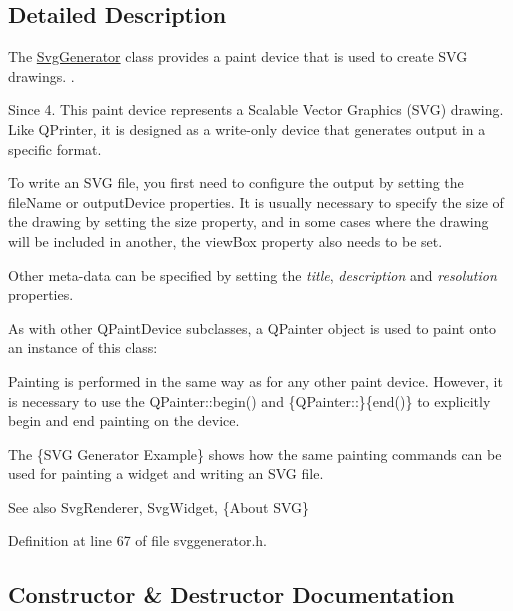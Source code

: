 \subsection{Detailed Description}
The \hyperlink{class_svg_generator}{Svg\+Generator} class provides a paint device that is used to create S\+VG drawings. . 

\begin{DoxySince}{Since}
4. This paint device represents a Scalable Vector Graphics (S\+VG) drawing. Like Q\+Printer, it is designed as a write-\/only device that generates output in a specific format.
\end{DoxySince}
To write an S\+VG file, you first need to configure the output by setting the  file\+Name or  output\+Device properties. It is usually necessary to specify the size of the drawing by setting the  size property, and in some cases where the drawing will be included in another, the  view\+Box property also needs to be set.


\begin{DoxyCodeInclude}
\end{DoxyCodeInclude}
 Other meta-\/data can be specified by setting the {\itshape title}, {\itshape description} and {\itshape resolution} properties.

As with other Q\+Paint\+Device subclasses, a Q\+Painter object is used to paint onto an instance of this class\+:


\begin{DoxyCodeInclude}
\end{DoxyCodeInclude}
 
\begin{DoxyCodeInclude}
\end{DoxyCodeInclude}
 Painting is performed in the same way as for any other paint device. However, it is necessary to use the Q\+Painter\+::begin() and \{Q\+Painter\+:\+:\}\{end()\} to explicitly begin and end painting on the device.

The \{S\+VG Generator Example\} shows how the same painting commands can be used for painting a widget and writing an S\+VG file.

\begin{DoxySeeAlso}{See also}
Svg\+Renderer, Svg\+Widget, \{About S\+VG\} 
\end{DoxySeeAlso}


Definition at line 67 of file svggenerator.\+h.



\subsection{Constructor \& Destructor Documentation}
\mbox{\label{class_svg_generator_a5e05e4c387fe37c16a70e8679f29ae35}} 
